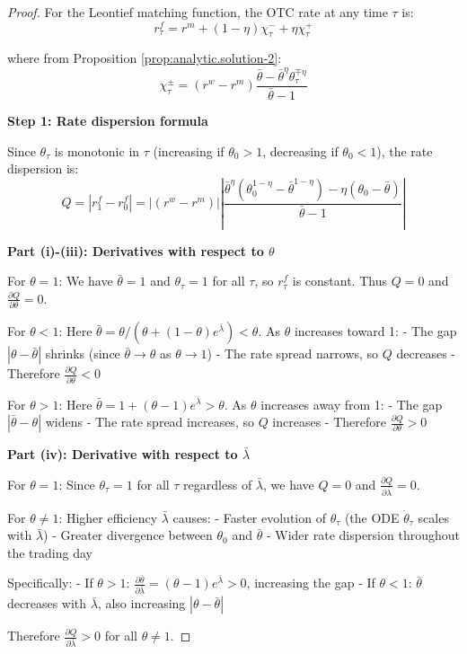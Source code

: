 \begin{proof}
For the Leontief matching function, the OTC rate at any time $\tau$ is:
\[
r^{f}_{\tau} = r^{m} + (1-\eta)\chi^{-}_{\tau} + \eta\chi^{+}_{\tau}
\]

where from Proposition \ref{prop:analytic.solution-2}:
\[
\chi^{\pm}_{\tau} = (r^{w}-r^{m})\frac{\bar{\theta} - \bar{\theta}^{\eta}\theta_{\tau}^{\mp\eta}}{\bar{\theta}-1}
\]

\textbf{Step 1: Rate dispersion formula}

Since $\theta_{\tau}$ is monotonic in $\tau$ (increasing if $\theta_0 > 1$, decreasing if $\theta_0 < 1$), the rate dispersion is:
\[
Q = |r^{f}_1 - r^{f}_0| = |(r^{w}-r^{m})|\left|\frac{\bar{\theta}^{\eta}(\theta_0^{1-\eta} - \bar{\theta}^{1-\eta}) - \eta(\theta_0 - \bar{\theta})}{\bar{\theta}-1}\right|
\]

\textbf{Part (i)-(iii): Derivatives with respect to $\theta$}

For $\theta = 1$: We have $\bar{\theta} = 1$ and $\theta_{\tau} = 1$ for all $\tau$, so $r^{f}_{\tau}$ is constant. Thus $Q = 0$ and $\frac{\partial Q}{\partial\theta} = 0$.

For $\theta < 1$: Here $\bar{\theta} = \theta/({\theta + (1-\theta)e^{\bar{\lambda}}}) < \theta$. As $\theta$ increases toward 1:
- The gap $|\theta - \bar{\theta}|$ shrinks (since $\bar{\theta} \to \theta$ as $\theta \to 1$)
- The rate spread narrows, so $Q$ decreases
- Therefore $\frac{\partial Q}{\partial\theta} < 0$

For $\theta > 1$: Here $\bar{\theta} = 1 + (\theta-1)e^{\bar{\lambda}} > \theta$. As $\theta$ increases away from 1:
- The gap $|\bar{\theta} - \theta|$ widens
- The rate spread increases, so $Q$ increases
- Therefore $\frac{\partial Q}{\partial\theta} > 0$

\textbf{Part (iv): Derivative with respect to $\bar{\lambda}$}

For $\theta = 1$: Since $\theta_{\tau} = 1$ for all $\tau$ regardless of $\bar{\lambda}$, we have $Q = 0$ and $\frac{\partial Q}{\partial\bar{\lambda}} = 0$.

For $\theta \neq 1$: Higher efficiency $\bar{\lambda}$ causes:
- Faster evolution of $\theta_{\tau}$ (the ODE $\dot{\theta}_{\tau}$ scales with $\bar{\lambda}$)
- Greater divergence between $\theta_0$ and $\bar{\theta}$
- Wider rate dispersion throughout the trading day

Specifically:
- If $\theta > 1$: $\frac{\partial\bar{\theta}}{\partial\bar{\lambda}} = (\theta-1)e^{\bar{\lambda}} > 0$, increasing the gap
- If $\theta < 1$: $\bar{\theta}$ decreases with $\bar{\lambda}$, also increasing $|\theta - \bar{\theta}|$

Therefore $\frac{\partial Q}{\partial\bar{\lambda}} > 0$ for all $\theta \neq 1$.
\end{proof}
